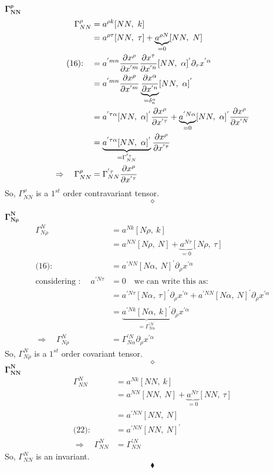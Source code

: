 $\boldsymbol{\Gamma^{\rho}_{N N}}$\\
\begin{align}
\Gamma^{\rho }_{N N} &= a^{\rho  k}[N N,\ k]\\
\ & = a^{\rho \tau}[N N,\ \tau]+ \underbrace{a^{\rho N}}_{=0}[N N,\ N]\\
\text{(16):}\quad &= a^{'mn}\pdv{x^\rho}{x^{'m}}\pdv{x^\tau}{x^{'n}}[NN, \ \alpha]^{'} \partial_{\tau}x^{'\alpha}\\
\ &= a^{'mn}\pdv{x^\rho}{x^{'m}} \underbrace{\pdv{x^{\alpha}}{x^{'n}}}_{= \delta^{\alpha}_{n}}[NN, \ \alpha]^{'} \\
\ &= a^{' \tau \alpha}[NN, \ \alpha]^{'}\pdv{x^\rho}{x^{' \tau}}+  \underbrace{a^{'N \alpha}}_{=0}[NN, \ \alpha]^{'}\pdv{x^\rho}{x^{'N}} \\
\ &= \underbrace{a^{' \tau \alpha}[NN, \ \alpha]^{'}}_{= \Gamma^{' \tau}_{NN}}\pdv{x^\rho}{x^{' \tau}}  \\
\Rightarrow \quad \Gamma^{\rho }_{N N} &= \Gamma^{' \tau}_{NN}\pdv{x^\rho}{x^{' \tau}}  
\end{align}
So, $\Gamma^{\rho }_{N N}$ is a $1^{st}$ order contravariant tensor.
$$\diamond$$

$\boldsymbol{\Gamma^{N}_{N \rho}}$\\
\begin{align}
\Gamma^{N}_{N \rho} &= a^{N  k}[N \rho,\ k]\\
\ & = a^{N N}[N \rho,\ N]+ \underbrace{a^{N \tau}}_{=0}[N \rho,\ \tau]\\
\text{(16):}\quad &= a^{'NN}[N\alpha, \ N ]^{'} \partial_{\rho}x^{'\alpha}\\
\text{considering :}\quad \ a^{'N \tau} & =0 \quad \text{we can write this as:}\\
\ &= a^{'N\tau}[N\alpha, \ \tau ]^{'} \partial_{\rho}x^{'\alpha}+ a^{'NN}[N\alpha, \ N ]^{'} \partial_{\rho}x^{'\alpha}\\
\ &= \underbrace{a^{'N k}[N \alpha, \ k ]^{'}}_{= \Gamma^{'N}_{N \alpha}} \partial_{\rho}x^{'\alpha}\\
\Rightarrow \quad \Gamma^{N}_{N \rho} &= \Gamma^{'N}_{N \alpha} \partial_{\rho}x^{'\alpha}
\end{align}
So, $\Gamma^{N}_{N \rho}$ is a $1^{st}$ order covariant tensor.
$$\diamond$$
\newpage
$\boldsymbol{\Gamma^{N}_{N N}}$\\
\begin{align}
\Gamma^{N}_{N N} &= a^{N  k}[N N,\ k]\\
\ & = a^{N N}[N N,\ N]+ \underbrace{a^{N \tau}}_{=0}[N N,\ \tau]\\
\ & = a^{'N N}[N N,\ N]\\
\text{(22):}\quad &= a^{'N N}[N N,\ N]^{'}\\
\Rightarrow \quad \Gamma^{N}_{N N} &= \Gamma^{'N}_{N N}
\end{align}
So, $\Gamma^{N}_{N N}$ is an invariant.
$$\blacklozenge$$
\newpage
